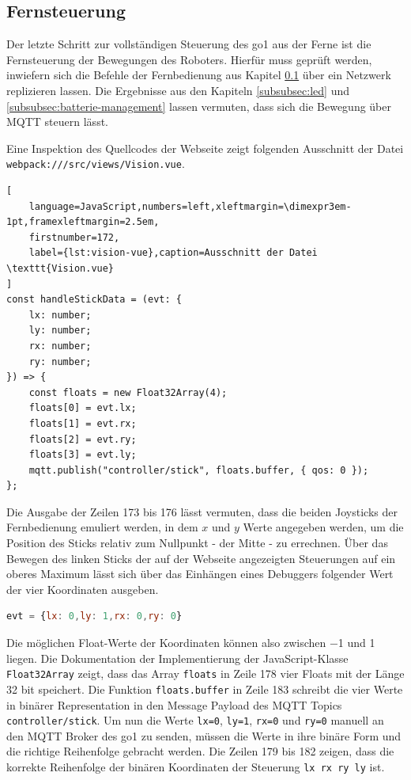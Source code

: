 \subsection{Fernsteuerung}
\label{subsec:fernsteuerung}

Der letzte Schritt zur vollständigen Steuerung des \gls{go1} aus der Ferne ist die Fernsteuerung der Bewegungen des
Roboters.
Hierfür muss geprüft werden, inwiefern sich die Befehle der Fernbedienung aus Kapitel \ref{subsec:fernsteuerung}
über ein Netzwerk replizieren lassen.
Die Ergebnisse aus den Kapiteln \ref{subsubsec:led} und \ref{subsubsec:batterie-management} lassen vermuten, dass sich
die Bewegung über MQTT steuern lässt.


Eine Inspektion des Quellcodes der Webseite zeigt folgenden Ausschnitt der Datei \texttt{webpack\allowbreak :///\allowbreak src/\allowbreak views/\allowbreak Vision.vue}.

\begin{lstlisting}[
    language=JavaScript,numbers=left,xleftmargin=\dimexpr3em-1pt,framexleftmargin=2.5em,
    firstnumber=172,
    label={lst:vision-vue},caption=Ausschnitt der Datei \texttt{Vision.vue}
]
const handleStickData = (evt: {
    lx: number;
    ly: number;
    rx: number;
    ry: number;
}) => {
    const floats = new Float32Array(4);
    floats[0] = evt.lx;
    floats[1] = evt.rx;
    floats[2] = evt.ry;
    floats[3] = evt.ly;
    mqtt.publish("controller/stick", floats.buffer, { qos: 0 });
};
\end{lstlisting}

Die Ausgabe der Zeilen \num{173} bis \num{176} lässt vermuten, dass die beiden Joysticks der Fernbedienung emuliert werden,
in dem $x$ und $y$ Werte angegeben werden, um die Position des Sticks relativ zum Nullpunkt - der Mitte - zu errechnen.
Über das Bewegen des linken Sticks der auf der Webseite angezeigten Steuerungen auf ein oberes Maximum lässt sich über
das Einhängen eines Debuggers folgender Wert der vier Koordinaten ausgeben.

\begin{lstlisting}[language=JavaScript]
evt = {lx: 0,ly: 1,rx: 0,ry: 0}
\end{lstlisting}

\noindent Die möglichen Float-Werte der Koordinaten können also zwischen \num{-1} und \num{1} liegen.
Die Dokumentation der Implementierung der JavaScript-Klasse \texttt{Float32Array} zeigt, dass das Array \texttt{floats}
in Zeile \num{178} vier Floats mit der Länge \num{32} bit speichert.
Die Funktion \texttt{floats.buffer} in Zeile \num{183} schreibt die vier Werte in binärer Representation in den Message
Payload des MQTT Topics \texttt{controller/stick}.
Um nun die Werte \texttt{lx=0}, \texttt{ly=1}, \texttt{rx=0} und \texttt{ry=0} manuell an den MQTT Broker des \gls{go1} zu
senden, müssen die Werte in ihre binäre Form und die richtige Reihenfolge gebracht werden.
Die Zeilen \num{179} bis \num{182} zeigen, dass die korrekte Reihenfolge der binären Koordinaten der Steuerung
\texttt{lx \textrightarrow rx \textrightarrow ry \textrightarrow ly} ist.

